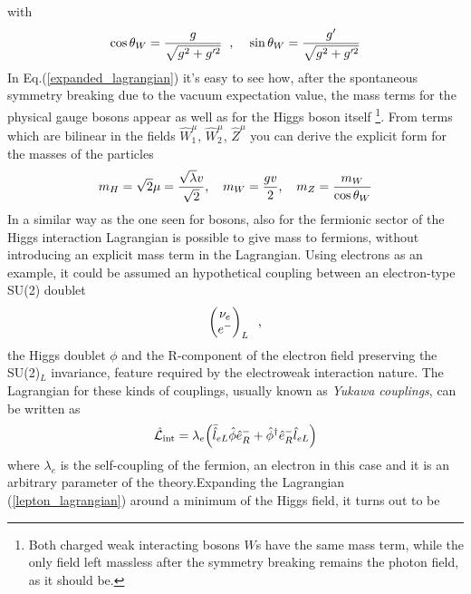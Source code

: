 with
\begin{equation}
\cos{\theta}_W = \frac{g}{\sqrt{g^2+g'^2}} \hspace{0.2cm} \text{,} \hspace{0.4cm} \sin{\theta}_W = \frac{g'}{\sqrt{g^2+g'^2}}
\end{equation}
In Eq.(\ref{expanded_lagrangian}) it's easy to see how, after the spontaneous symmetry breaking due to the vacuum expectation value, the mass terms for the physical gauge bosons appear as well as for the Higgs boson itself
\footnote{Both charged weak interacting bosons $W$s have the same mass term, while the only field left massless after the symmetry breaking remains the photon field, as it should be.}.
From terms which are bilinear in the fields $\hat{W}_1^{\mu}$, $\hat{W}_2^{\mu}$, $\hat{Z}^{\mu}$ you can derive the explicit form for the masses of the particles
\begin{equation}
m_H = \sqrt{2} \mu = \frac{\sqrt{\lambda}v}{\sqrt{2}} \text{,} \hspace{0.4cm} m_W = \frac{gv}{2} \text{,} \hspace{0.4cm} m_Z = \frac{m_W}{\cos{\theta}_W} 
\end{equation}
In a similar way as the one seen for bosons, also for the fermionic sector of the Higgs interaction Lagrangian is possible to give mass to fermions, without introducing an explicit mass term in the Lagrangian. Using electrons as an example, it could be assumed an hypothetical coupling between an electron-type SU(2) doublet
\begin{equation}
\begin{pmatrix}
\nu_{e} \\ e^- 
\end{pmatrix}_L \hspace{0.2cm} \text{,}
\end{equation}
the Higgs doublet $\phi$ and the R-component of the electron field preserving the SU(2)$_L$ invariance, feature required by the electroweak interaction nature. The Lagrangian for these kinds of couplings, usually known as \emph{Yukawa couplings}, can be written as 
\begin{equation}
\mathcal{\hat{L}}_{\text{int}} = \lambda_e\Bigl(\bar{\hat{l}}_{eL}\hat{\phi} \hat{e}^-_R + \hat{\phi}^{\dag}\hat{e}^-_R\hat{l}_{eL}\Bigr)
\label{lepton_lagrangian}
\end{equation}
where $\lambda_e$ is the self-coupling of the fermion, an electron in this case and it is an arbitrary parameter of the theory.Expanding the Lagrangian (\ref{lepton_lagrangian}) around a minimum of the Higgs field, it turns out to be
